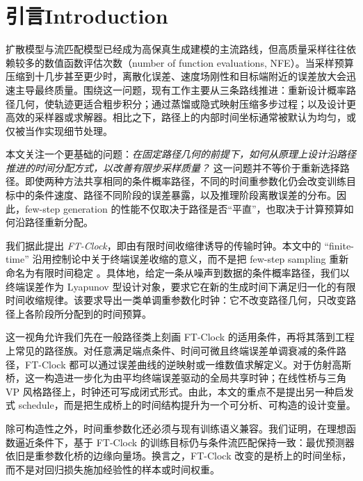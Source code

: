 \section{\ifinternalcn 引言\else Introduction\fi}

\ifinternalcn
扩散模型与流匹配模型已经成为高保真生成建模的主流路线，但高质量采样往往依赖较多的数值函数评估次数（number of function evaluations, NFE）\citep{ho2020ddpm,song2021score,lipman2023flowmatching}。当采样预算压缩到十几步甚至更少时，离散化误差、速度场刚性和目标端附近的误差放大会迅速主导最终质量。围绕这一问题，现有工作主要从三条路线推进：重新设计概率路径几何，使轨迹更适合粗步积分；通过蒸馏或隐式映射压缩多步过程；以及设计更高效的采样器或求解器。相比之下，路径上的内部时间坐标通常被默认为均匀，或仅被当作实现细节处理。

本文关注一个更基础的问题：\emph{在固定路径几何的前提下，如何从原理上设计沿路径推进的时间分配方式，以改善有限步采样质量？} 这一问题并不等价于重新选择路径。即使两种方法共享相同的条件概率路径，不同的时间重参数化仍会改变训练目标中的条件速度、路径不同阶段的误差暴露，以及推理阶段离散误差的分布。因此，few-step generation 的性能不仅取决于路径是否“平直”，也取决于计算预算如何沿路径重新分配。

我们据此提出 \emph{FT-Clock}，即由有限时间收缩律诱导的传输时钟。本文中的 ``finite-time'' 沿用控制论中关于终端误差收缩的意义，而不是把 few-step sampling 重新命名为有限时间稳定 \citep{bhat2000finite}。具体地，给定一条从噪声到数据的条件概率路径，我们以终端误差作为 Lyapunov 型设计对象，要求它在新的生成时间下满足归一化的有限时间收缩规律。该要求导出一类单调重参数化时钟：它不改变路径几何，只改变路径上各阶段所分配到的时间预算。

这一视角允许我们先在一般路径类上刻画 FT-Clock 的适用条件，再将其落到工程上常见的路径族。对任意满足端点条件、时间可微且终端误差单调衰减的条件路径，FT-Clock 都可以通过误差曲线的逆映射或一维数值求解定义。对于仿射高斯桥，这一构造进一步化为由平均终端误差驱动的全局共享时钟；在线性桥与三角 VP 风格路径上，时钟还可写成闭式形式。由此，本文的重点不是提出另一种启发式 schedule，而是把生成桥上的时间结构提升为一个可分析、可构造的设计变量。

除可构造性之外，时间重参数化还必须与现有训练语义兼容。我们证明，在理想函数逼近条件下，基于 FT-Clock 的训练目标仍与条件流匹配保持一致：最优预测器依旧是重参数化桥的边缘向量场。换言之，FT-Clock 改变的是桥上的时间坐标，而不是对回归损失施加经验性的样本或时间权重。


